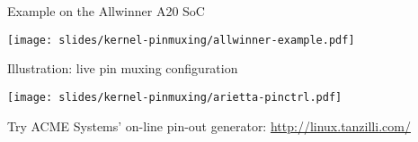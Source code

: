 \begin{frame}[fragile]{Example on the Allwinner A20 SoC}
  \begin{center}
    \texttt{[image: slides/kernel-pinmuxing/allwinner-example.pdf]}
  \end{center}
\end{frame}

\begin{frame}[fragile]{Illustration: live pin muxing configuration}
  \begin{center}
    \texttt{[image: slides/kernel-pinmuxing/arietta-pinctrl.pdf]}
  \end{center}
  Try ACME Systems' on-line pin-out generator: \url{http://linux.tanzilli.com/}
\end{frame}


